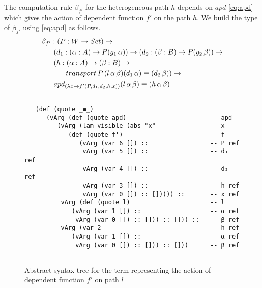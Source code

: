 \documentclass[sigplan,10pt]{acmart}
\begin{document}
The computation rule $\beta_{f'}$ for the heterogeneous path $h$ depends on $apd$ \eqref{eq:apd} which gives the action of dependent function $f'$ on the path $h$. We build the type of $\beta_{f'}$ using \eqref{eq:apd} as follows.
\begin{align}
&\beta_{f'} : (P : W \rightarrow Set) \rightarrow \nonumber \\
& \hspace {0.6cm} (d_1 : (\alpha : A) \rightarrow P (g_1 \, \alpha)) \rightarrow (d_2 : (\beta : B) \rightarrow P (g_2 \, \beta)) \rightarrow \nonumber \\ 
& \hspace {0.6cm} (h : (\alpha : A) \rightarrow (\beta : B) \rightarrow \nonumber \\
& \hspace {1.2cm} transport \, P \, (l \, \alpha \, \beta) (d_1 \, \alpha) \equiv (d_2 \, \beta)) \rightarrow \nonumber \\
& \hspace {0.6cm} apd_{(\lambda x \rightarrow f'(P, d_1, d_2, h, x))}(l \, \alpha \, \beta) \equiv (h \, \alpha \, \beta) \nonumber
\end{align}

\begin{figure}
\begin{center}
\begingroup
\fontsize{7pt}{9pt}\selectfont
\begin{Verbatim}[frame = single]

   (def (quote _≡_) 
      (vArg (def (quote apd)                       -- apd
         (vArg (lam visible (abs "x"               -- x
            (def (quote f')                        -- f
               (vArg (var 6 []) ::                 -- P ref
                vArg (var 5 []) ::                 -- d₁ ref
                vArg (var 4 []) ::                 -- d₂ ref
                vArg (var 3 []) ::                 -- h ref
                vArg (var 0 []) :: [])))) ::       -- x ref
          vArg (def (quote l)                      -- l
             (vArg (var 1 []) ::                   -- α ref
              vArg (var 0 []) :: [])) :: [])) ::   -- β ref
          vArg (var 2                              -- h ref
             (vArg (var 1 []) ::                   -- α ref
              vArg (var 0 []) :: [])) :: []))      -- β ref
             
\end{Verbatim}
\endgroup
\end{center}
\caption{Abstract syntax tree for the term representing the action of dependent function $f'$ on path $l$}
\label{fig:ast-beta-f'}
\end{figure}
\end{document}

